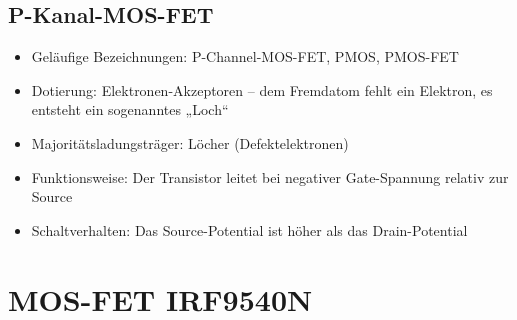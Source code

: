 \subsection{P-Kanal-MOS-FET}
\begin{itemize}
	\item Geläufige Bezeichnungen: P-Channel-MOS-FET, PMOS, PMOS-FET
	\item Dotierung: Elektronen-Akzeptoren – dem Fremdatom fehlt ein Elektron, es entsteht ein sogenanntes „Loch“
	\item Majoritätsladungsträger: Löcher (Defektelektronen)
	\item Funktionsweise: Der Transistor leitet bei negativer Gate-Spannung relativ zur Source
	\item Schaltverhalten: Das Source-Potential ist höher als das Drain-Potential
\end{itemize}

\section{MOS-FET IRF9540N}

